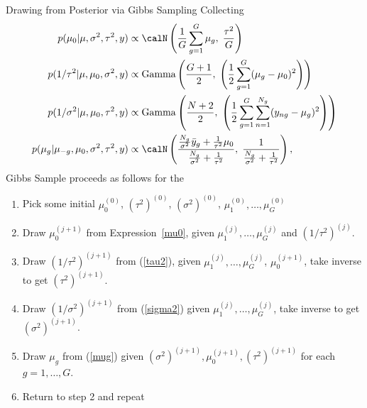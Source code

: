 \documentclass[aspectratio=169, handout]{beamer}
\begin{document}
{\scriptsize
\begin{frame}{Drawing from Posterior via Gibbs Sampling}
Collecting
\vspace{-10pt}
\begin{align}
  p(\mu_0|\mu,\sigma^2, \tau^2,y)
  &\propto
  \calN\left(
    \frac{1}{G}
    \sum_{g=1}^G
    \mu_g
    ,\;
    \frac{\tau^2}{G}
  \right)
  \label{mu0}
  \\
  p(1/\tau^2|\mu,\mu_0,\sigma^2,y)
  &\propto
  \text{Gamma}\left(
  \frac{G+1}{2}
  ,\;
    \left(
    \frac{1}{2}
    \sum_{g=1}^G
    (\mu_g-\mu_0)^2
    \right)
  \right)
  \label{tau2}
  \\
  p(1/\sigma^2|\mu,\mu_0,\tau^2,y)
  &\propto
  \text{Gamma}
  \left(
  \frac{N+2}{2},
  \;
    \left(
    \frac{1}{2}
    \sum_{g=1}^G
    \sum_{n=1}^{N_g}
    (y_{ng}-\mu_g)^2
    \right)
  \right)
  \label{sigma2}
  \\
    p(\mu_g | \mu_{-g}, \mu_0, \sigma^2, \tau^2, y)
    &\propto \calN\left(\frac{
      \frac{N_g}{\sigma^2} \bar{y}_g
      + \frac{1}{\tau^2}\mu_0}{\frac{N_g}{\sigma^2} + \frac{1}{\tau^2}},
      \; \frac{1}{ \frac{N_g}{\sigma^2} + \frac{1}{\tau^2}} \right),
  \label{mug}
\end{align}
Gibbs Sample proceeds as follows for the
\begin{enumerate}
\vspace{-7pt}
  \item Pick some initial $\mu_0^{(0)}$,
    $(\tau^2)^{(0)}$,
    $(\sigma^2)^{(0)}$,
    $\mu_1^{(0)},\ldots,\mu_G^{(0)}$

  \item
    Draw $\mu_0^{(j+1)}$ from Expression~\ref{mu0},
    given $\mu_1^{(j)},\ldots,\mu_G^{(j)}$
    and $(1/\tau^2)^{(j)}$.

  \item
    Draw $(1/\tau^2)^{(j+1)}$ from (\ref{tau2}),
    given $\mu_1^{(j)},\ldots,\mu_G^{(j)}$, $\mu_0^{(j+1)}$,
    take inverse to get $(\tau^2)^{(j+1)}$.

  \item
    Draw $(1/\sigma^2)^{(j+1)}$ from (\ref{sigma2})
    given $\mu_1^{(j)},\ldots,\mu_G^{(j)}$,
    take inverse to get $(\sigma^2)^{(j+1)}$.

  \item
    Draw $\mu_g$ from (\ref{mug})
    given $(\sigma^2)^{(j+1)},\mu_0^{(j+1)},(\tau^2)^{(j+1)}$
    for each $g=1,\ldots,G$.
  \item Return to step 2 and repeat
\end{enumerate}
\end{frame}
}
\end{document}
